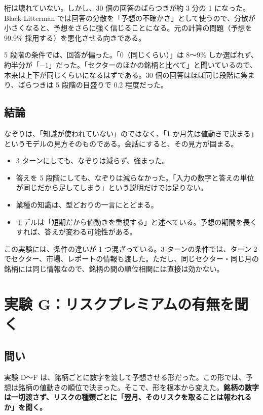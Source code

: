 \documentclass[xelatex,ja=standard,jafont=hiragino-pron,a4paper,10pt]{bxjsreport}
\begin{document}
桁は壊れていない。しかし、30 個の回答のばらつきが約 3 分の 1 になった。Black-Litterman では回答の分散を「予想の不確かさ」として使うので、分散が小さくなると、予想をさらに強く信じることになる。元の計算の問題（予想を 99.9\% 採用する）を悪化させる向きである。

5 段階の条件では、回答が偏った。「0（同じくらい）」は 8〜9\% しか選ばれず、約半分が「$-1$」だった。「セクターのほかの銘柄と比べて」と聞いているので、本来は上下が同じくらいになるはずである。30 個の回答はほぼ同じ段階に集まり、ばらつきは 5 段階の目盛りで 0.2 程度だった。

\section{結論}

\begin{keybox}
なぞりは、「知識が使われていない」のではなく、「1 か月先は値動きで決まる」というモデルの見方そのものである。会話にすると、その見方が固まる。
\end{keybox}

\begin{itemize}
\item 3 ターンにしても、なぞりは減らず、強まった。
\item 答えを 5 段階にしても、なぞりは減らなかった。「入力の数字と答えの単位が同じだから足してしまう」という説明だけでは足りない。
\item 業種の知識は、型どおりの一言にとどまる。
\item モデルは「短期だから値動きを重視する」と述べている。予想の期間を長くすれば、答えが変わる可能性がある。
\end{itemize}

この実験には、条件の違いが 1 つ混ざっている。3 ターンの条件では、ターン 2 でセクター、市場、レポートの情報も渡した。ただし、同じセクター・同じ月の銘柄には同じ情報なので、銘柄の間の順位相関には直接は効かない。

\chapter{実験 G：リスクプレミアムの有無を聞く}\label{ch:expG}

\section{問い}

実験 D〜F は、銘柄ごとに数字を渡して予想させる形だった。この形では、予想は銘柄の値動きの順位で決まった。そこで、形を根本から変えた。\textbf{銘柄の数字は一切渡さず、リスクの種類ごとに「翌月、そのリスクを取ることは報われるか」を聞く。}
\end{document}
